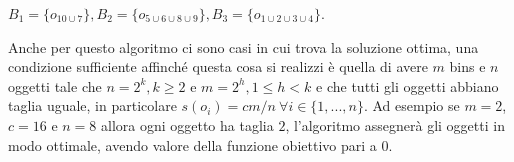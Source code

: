 \begin{center}
	$ B_1 = \{o_{10 \cup 7}\}, B_2 = \{o_{5 \cup 6 \cup 8 \cup 9}\}, B_3 = \{o_{1 \cup 2 \cup 3 \cup 4}\} $.
\end{center}

\noindent
Anche per questo algoritmo ci sono casi in cui trova la soluzione ottima, una condizione sufficiente affinché questa cosa si realizzi
è quella di avere $ m $ bins e $ n $ oggetti tale che $ n = 2^k, k \geq 2 $ e $ m = 2^h, 1 \leq h < k $ e che tutti gli oggetti abbiano taglia uguale,
in particolare $ s(o_i) = cm/n \: \forall i \in \{1, ..., n\} $.
Ad esempio se $ m = 2 $, $ c = 16 $ e $ n = 8 $ allora ogni oggetto ha taglia $ 2 $, l'algoritmo assegnerà gli oggetti in modo
ottimale, avendo valore della funzione obiettivo pari a $ 0 $.
